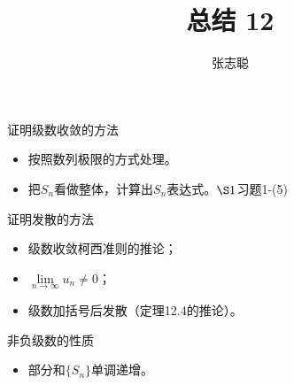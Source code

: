 \documentclass{article}
\begin{document}
\title{总结 12}
\author{张志聪}
\maketitle

\begin{zremark}
  证明级数收敛的方法
\end{zremark}

\begin{itemize}
  \item 按照数列极限的方式处理。
  \item 把$S_n$看做整体，计算出$S_n$表达式。$\S 1$习题1-(5)
\end{itemize}

\begin{zremark}
  证明发散的方法
\end{zremark}

\begin{itemize}
  \item 级数收敛柯西准则的推论；
  \item $\lim \limits_{n \to \infty} u_n \neq 0$；
  \item 级数加括号后发散（定理12.4的推论）。
\end{itemize}

\begin{zremark}
  非负级数的性质
\end{zremark}

\begin{itemize}
  \item 部分和$\{S_n\}$单调递增。
\end{itemize}
\end{document}
